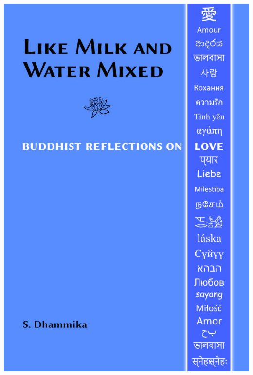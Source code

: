 \documentclass[10pt, openright]{book}
\begin{document}
\frontmatter

\pagestyle{empty}

\includegraphics[scale= 2, trim= 0 0 0 0]{../_resources/book-data/milk/FrontLarge.jpg}

\newpage~\newpage~
\end{document}
